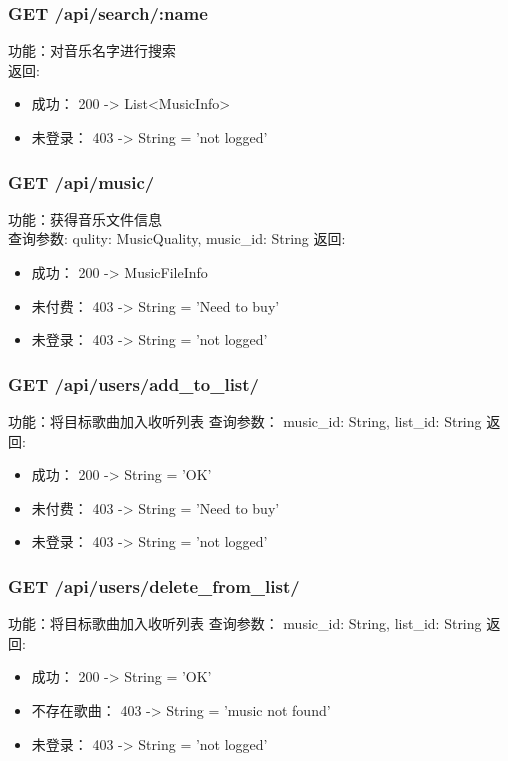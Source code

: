 \subsubsection{GET /api/search/:name}

\noindent
功能：对音乐名字进行搜索\\
返回:
\begin{itemize}
	\item 成功： 200 -> List<MusicInfo>
	\item 未登录： 403 -> String = 'not logged'
\end{itemize}

\subsubsection{GET /api/music/}

\noindent
功能：获得音乐文件信息\\
查询参数: qulity: MusicQuality, music\_id: String
返回:
\begin{itemize}
	\item 成功： 200 -> MusicFileInfo
	\item 未付费： 403 -> String = 'Need to buy'
	\item 未登录： 403 -> String = 'not logged'
\end{itemize}


\subsubsection{GET /api/users/add\_to\_list/}

\noindent
功能：将目标歌曲加入收听列表
查询参数： music\_id: String, list\_id: String
返回:
\begin{itemize}
	\item 成功： 200 -> String = 'OK'
	\item 未付费： 403 -> String = 'Need to buy'
	\item 未登录： 403 -> String = 'not logged'
\end{itemize}


\subsubsection{GET /api/users/delete\_from\_list/}

\noindent
功能：将目标歌曲加入收听列表
查询参数： music\_id: String, list\_id: String
返回:
\begin{itemize}
	\item 成功： 200 -> String = 'OK'
	\item 不存在歌曲： 403 -> String = 'music not found'
	\item 未登录： 403 -> String = 'not logged'
\end{itemize}

